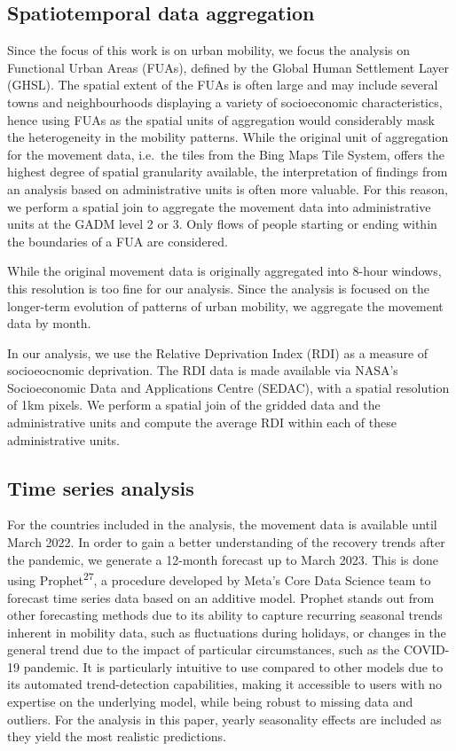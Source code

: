\documentclass[
  11pt,
]{article}
\begin{document}
\subsection{Spatiotemporal data
aggregation}\label{spatiotemporal-data-aggregation}

Since the focus of this work is on urban mobility, we focus the analysis
on Functional Urban Areas (FUAs), defined by the Global Human Settlement
Layer (GHSL). The spatial extent of the FUAs is often large and may
include several towns and neighbourhoods displaying a variety of
socioeconomic characteristics, hence using FUAs as the spatial units of
aggregation would considerably mask the heterogeneity in the mobility
patterns. While the original unit of aggregation for the movement data,
i.e.~the tiles from the Bing Maps Tile System, offers the highest degree
of spatial granularity available, the interpretation of findings from an
analysis based on administrative units is often more valuable. For this
reason, we perform a spatial join to aggregate the movement data into
administrative units at the GADM level 2 or 3. Only flows of people
starting or ending within the boundaries of a FUA are considered.

While the original movement data is originally aggregated into 8-hour
windows, this resolution is too fine for our analysis. Since the
analysis is focused on the longer-term evolution of patterns of urban
mobility, we aggregate the movement data by month.

In our analysis, we use the Relative Deprivation Index (RDI) as a
measure of socioeocnomic deprivation. The RDI data is made available via
NASA's Socioeconomic Data and Applications Centre (SEDAC), with a
spatial resolution of 1km pixels. We perform a spatial join of the
gridded data and the administrative units and compute the average RDI
within each of these administrative units.

\subsection{Time series analysis}\label{time-series-analysis}

For the countries included in the analysis, the movement data is
available until March 2022. In order to gain a better understanding of
the recovery trends after the pandemic, we generate a 12-month forecast
up to March 2023. This is done using Prophet\textsuperscript{27}, a
procedure developed by Meta's Core Data Science team to forecast time
series data based on an additive model. Prophet stands out from other
forecasting methods due to its ability to capture recurring seasonal
trends inherent in mobility data, such as fluctuations during holidays,
or changes in the general trend due to the impact of particular
circumstances, such as the COVID-19 pandemic. It is particularly
intuitive to use compared to other models due to its automated
trend-detection capabilities, making it accessible to users with no
expertise on the underlying model, while being robust to missing data
and outliers. For the analysis in this paper, yearly seasonality effects
are included as they yield the most realistic predictions.
\end{document}
